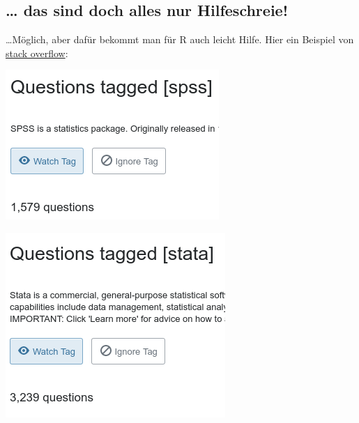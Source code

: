 \documentclass[
]{book}
\begin{document}
\hypertarget{das-sind-doch-alles-nur-hilfeschreie}{%
\subsection{\ldots{} das sind doch alles nur Hilfeschreie!}\label{das-sind-doch-alles-nur-hilfeschreie}}

\ldots Möglich, aber dafür bekommt man für R auch leicht Hilfe.
Hier ein Beispiel von \href{https://stackoverflow.com}{stack overflow}:

\begin{center}\includegraphics[width=0.8\linewidth]{imgs/so_spss} \end{center}

\begin{center}\includegraphics[width=0.8\linewidth]{imgs/so_stata} \end{center}
\end{document}
